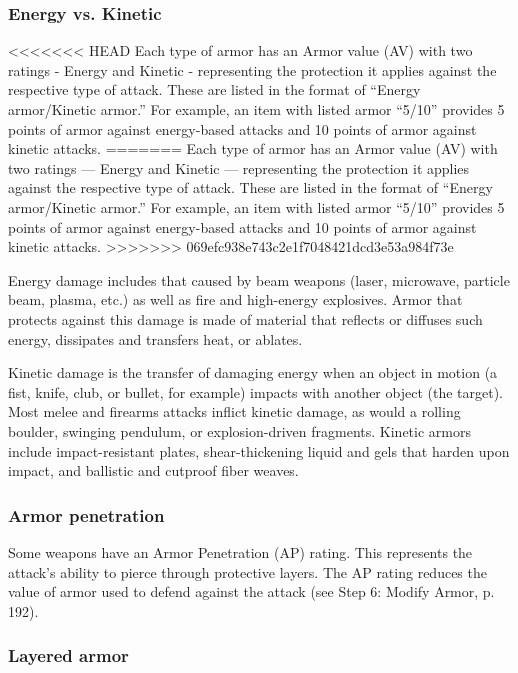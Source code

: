 \subsubsection{Energy vs. Kinetic} 

<<<<<<< HEAD Each type of armor has an Armor value (AV) with two ratings - Energy and Kinetic - representing the protection it applies against the respective type of attack. These are listed in the format of ``Energy armor/Kinetic armor.'' For example, an item with listed armor ``5/10'' provides 5 points of armor against energy-based attacks and 10 points of armor against kinetic attacks. ======= Each type of armor has an Armor value (AV) with two ratings --- Energy and Kinetic --- representing the protection it applies against the respective type of attack. These are listed in the format of ``Energy armor/Kinetic armor.'' For example, an item with listed armor ``5/10'' provides 5 points of armor against energy-based attacks and 10 points of armor against kinetic attacks. >>>>>>> 069efc938e743c2e1f7048421dcd3e53a984f73e 

Energy damage includes that caused by beam weapons (laser, microwave, particle beam, plasma, etc.) as well as fire and high-energy explosives. Armor that protects against this damage is made of material that reflects or diffuses such energy, dissipates and transfers heat, or ablates. 

Kinetic damage is the transfer of damaging energy when an object in motion (a fist, knife, club, or bullet, for example) impacts with another object (the target). Most melee and firearms attacks inflict kinetic damage, as would a rolling boulder, swinging pendulum, or explosion-driven fragments. Kinetic armors include impact-resistant plates, shear-thickening liquid and gels that harden upon impact, and ballistic and cutproof fiber weaves. 

\subsubsection{Armor penetration} 

Some weapons have an Armor Penetration (AP) rating. This represents the attack’s ability to pierce through protective layers. The AP rating reduces the value of armor used to defend against the attack (see Step 6: Modify Armor, p. 192). 

\subsubsection{Layered armor} 

